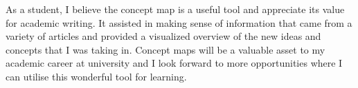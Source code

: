 \documentclass[12pt,a4paper]{report}
\begin{document}
As a student, I believe the concept map is a useful tool and appreciate its value for academic writing. It assisted in making sense of information that came from a variety of articles and provided a visualized overview of the new ideas and concepts that I was taking in. Concept maps will be a valuable asset to my academic career at university and I look forward to more opportunities where I can utilise this wonderful tool for learning.

\newpage
{}


\end{document}
